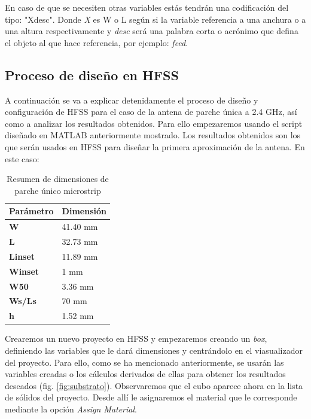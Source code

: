\par En caso de que se necesiten otras variables estás tendrán una codificación del tipo: "Xdesc". Donde \textit{X} es W o L según si la variable referencia a una anchura o a una altura respectivamente y \textit{desc} será una palabra corta o acrónimo que defina el objeto al que hace referencia, por ejemplo: \textit{feed}.


\subsection{Proceso de diseño en HFSS}
\label{procesodiseno}
\par A continuación se va a explicar detenidamente el proceso de diseño y configuración de HFSS para el caso de la antena de parche única a 2.4 GHz, así como a analizar los resultados obtenidos. Para ello empezaremos usando el script diseñado en MATLAB anteriormente mostrado. Los resultados obtenidos son los que serán usados en HFSS para diseñar la primera aproximación de la antena. En este caso:

\begin{table}[H]
   
   \label{tab:antena1x12}
   \small %
   \centering %
   \begin{tabular}{m{0.2\linewidth}m{0.15\linewidth}} %
   \toprule[\heavyrulewidth]\toprule[\heavyrulewidth]
   \textbf{Parámetro} & \textbf{Dimensión} \\ 
   \midrule
   \textbf{W} & 41.40 mm \\
   \textbf{L} & 32.73 mm \\
   \textbf{Linset} & 11.89 mm \\
   \textbf{Winset} & 1 mm \\
   \textbf{W50} & 3.36 mm \\
   \textbf{Ws/Ls} & 70 mm \\
   \textbf{h} & 1.52 mm \\
   \bottomrule[\heavyrulewidth] 
   \end{tabular}
   \caption{Resumen de dimensiones de parche único microstrip} 
\end{table}

\par Crearemos un nuevo proyecto en HFSS y empezaremos creando un \textit{box}, definiendo las variables que le dará dimensiones y centrándolo en el viasualizador del proyecto. Para ello, como se ha mencionado anteriormente, se usarán las variables creadas o los cálculos derivados de ellas para obtener los resultados deseados (fig. \ref{fig:substrato}). Observaremos que el cubo aparece ahora en la lista de sólidos del proyecto. Desde allí le asignaremos el material que le corresponde mediante la opción \textit{Assign Material}. 
\\

